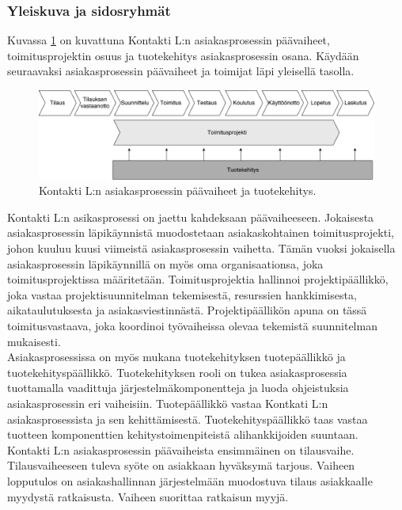 \documentclass[finnish,12pt,a4paper,pdftex]{article}
\begin{document}
\subsubsection{Yleiskuva ja sidosryhmät}

Kuvassa \ref{fig:paavaih} on kuvattuna Kontakti L:n asiakasprosessin päävaiheet, toimitusprojektin osuus ja tuotekehitys asiakasprosessin osana. Käydään seuraavaksi asiakasprosessin päävaiheet ja toimijat läpi yleisellä tasolla.\\

\begin{figure}[!h]
    \centering
    \includegraphics[scale=0.4]{images/ODI-prosessi.pdf}
    \caption{Kontakti L:n asiakasprosessin päävaiheet ja tuotekehitys.}
    \label{fig:paavaih}
\end{figure}

Kontakti L:n asikasprosessi on jaettu kahdeksaan päävaiheeseen. Jokaisesta asiakasprosessin läpikäynnistä muodostetaan asiakaskohtainen toimitusprojekti, johon kuuluu kuusi viimeistä asiakasprosessin vaihetta. Tämän vuoksi jokaisella asiakasprosessin läpikäynnillä on myös oma organisaationsa, joka toimitusprojektissa määritetään. Toimitusprojektia hallinnoi projektipäällikkö, joka vastaa projektisuunnitelman tekemisestä, resurssien hankkimisesta, aikataulutuksesta ja asiakasviestinnästä. Projektipäällikön apuna on tässä toimitusvastaava, joka koordinoi työvaiheissa olevaa tekemistä suunnitelman mukaisesti.\\

Asiakasprosessissa on myös mukana tuotekehityksen tuotepäällikkö ja tuotekehityspäällikkö. Tuotekehityksen rooli on tukea asiakasprosessia tuottamalla vaadittuja järjestelmäkomponentteja ja luoda ohjeistuksia asiakasprosessin eri vaiheisiin. Tuotepäällikkö vastaa Kontkati L:n asiakasprosessista ja sen kehittämisestä. Tuotekehityspäällikkö taas vastaa tuotteen komponenttien kehitystoimenpiteistä alihankkijoiden suuntaan.\\

Kontakti L:n asiakasprosessin päävaiheista ensimmäinen on tilausvaihe. Tilausvaiheeseen tuleva syöte on asiakkaan hyväksymä tarjous. Vaiheen lopputulos on asiakashallinnan järjestelmään muodostuva tilaus asiakkaalle myydystä ratkaisusta. Vaiheen suorittaa ratkaisun myyjä.\\
\end{document}
